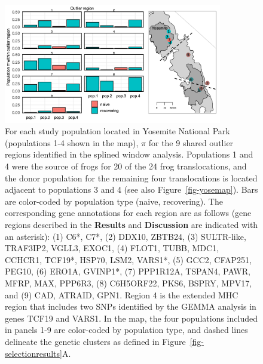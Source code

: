 \documentclass[9pt,twoside,lineno]{pnas-new-SI}
\begin{document}
\begin{figure}

{\centering \includegraphics[width=0.85\textwidth]{figures/ave_pi_per_popn_yose.png}

}

\caption{\label{fig-ave-pi-per-popn-yose}For each study population
located in Yosemite National Park (populations 1-4 shown in the map),
\(\pi\) for the 9 shared outlier regions identified in the splined
window analysis. Populations 1 and 4 were the source of frogs for 20 of
the 24 frog translocations, and the donor population for the remaining
four translocations is located adjacent to populations 3 and 4 (see also
Figure~\ref{fig-yosemap}). Bars are color-coded by population type
(naive, recovering). The corresponding gene annotations for each region
are as follows (gene regions described in the \textbf{Results} and
\textbf{Discussion} are indicated with an asterisk): (1) C6*, C7*, (2)
DDX10, ZBTB24, (3) SULTR-like, TRAF3IP2, VGLL3, EXOC1, (4) FLOT1, TUBB,
MDC1, CCHCR1, TCF19*, HSP70, LSM2, VARS1*, (5) GCC2, CFAP251, PEG10, (6)
ERO1A, GVINP1*, (7) PPP1R12A, TSPAN4, PAWR, MFRP, MAX, PPP6R3, (8)
C6H5ORF22, PKS6, BSPRY, MPV17, and (9) CAD, ATRAID, GPN1. Region 4 is
the extended MHC region that includes two SNPs identified by the GEMMA
analysis in genes TCF19 and VARS1. In the map, the four populations
included in panels 1-9 are color-coded by population type, and dashed
lines delineate the genetic clusters as defined in
Figure~\ref{fig-selectionresults}A.}

\end{figure}\clearpage

\newpage
\end{document}
